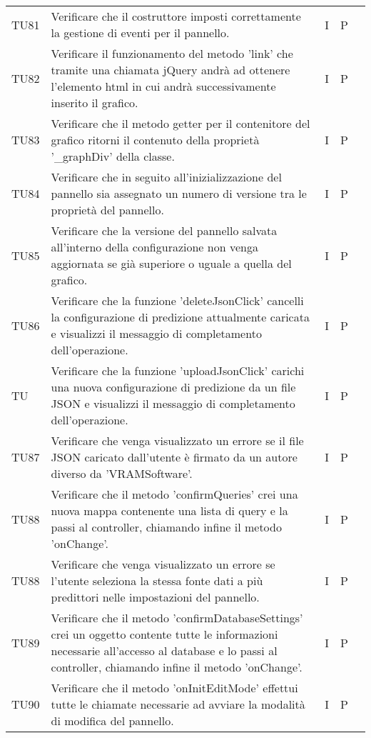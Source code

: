 \begin{longtable} {
		>{}p{15mm} 
		>{}p{79.5mm}
		>{}p{15mm} 
		>{}p{15mm}
		>{}p{0mm}}
	TU81		& Verificare che il costruttore imposti correttamente la gestione di eventi per il pannello.& I & P &\TBstrut \\ [2mm]
	TU82		& Verificare il funzionamento del metodo 'link' che tramite una chiamata jQuery andrà ad ottenere l'elemento html in cui andrà successivamente inserito il grafico.& I & P &\TBstrut \\ [2mm]
	TU83		& Verificare che il metodo getter per il contenitore del grafico ritorni il contenuto della proprietà '\_graphDiv' della classe.& I & P &\TBstrut \\ [2mm]
	TU84		& Verificare che in seguito all'inizializzazione del pannello sia assegnato un numero di versione tra le proprietà del pannello.& I & P &\TBstrut \\ [2mm]
	TU85		& Verificare che la versione del pannello salvata all'interno della configurazione non venga aggiornata se già superiore o uguale a quella del grafico.& I & P &\TBstrut \\ [2mm]
	TU86		& Verificare che la funzione 'deleteJsonClick' cancelli la configurazione di predizione attualmente caricata e visualizzi il messaggio di completamento dell'operazione.& I & P &\TBstrut \\ [2mm]
	TU		    & Verificare che la funzione 'uploadJsonClick' carichi una nuova configurazione di predizione da un file JSON e visualizzi il messaggio di completamento dell'operazione.& I & P &\TBstrut \\ [2mm]
	TU87		& Verificare che venga visualizzato un errore se il file JSON caricato dall'utente è firmato da un autore diverso da 'VRAMSoftware'.& I & P &\TBstrut \\ [2mm]
	TU88		& Verificare che il metodo 'confirmQueries' crei una nuova mappa contenente una lista di query e la passi al controller, chiamando infine il metodo 'onChange'.& I & P &\TBstrut \\ [2mm]
	TU88		& Verificare che venga visualizzato un errore se l'utente seleziona la stessa fonte dati a più predittori nelle impostazioni del pannello.& I & P &\TBstrut \\ [2mm]
	TU89		& Verificare che il metodo 'confirmDatabaseSettings' crei un oggetto contente tutte le informazioni necessarie all'accesso al database e lo passi al controller, chiamando infine il metodo 'onChange'.& I & P &\TBstrut \\ [2mm]
	TU90		& Verificare che il metodo 'onInitEditMode' effettui tutte le chiamate necessarie ad avviare la modalità di modifica del pannello.& I & P &\TBstrut \\ [2mm]

\end{longtable}
